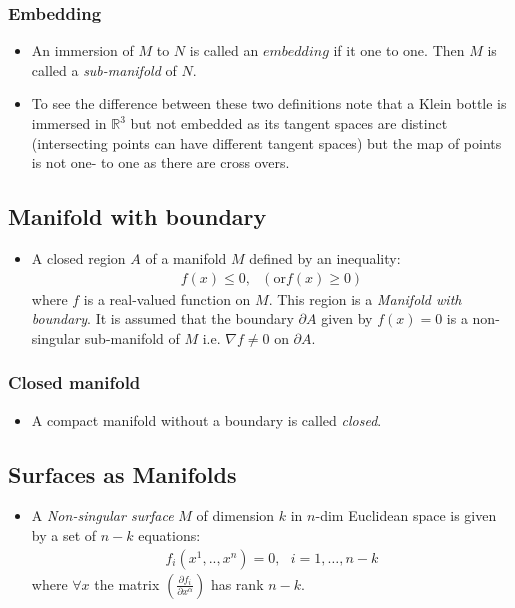 \documentclass[11pt]{article}
\numberwithin{equation}{section}
\DeclareRobustCommand{\RR}{\mathbb{R}}
\begin{document}
\subsubsection{Embedding}
\begin{itemize}
  \item An immersion of $M$ to $N$ is called an $embedding$ if it one to one. Then $M$ is called a \emph{sub-manifold} of $N$. 

  \item To see the difference between these two definitions note that a Klein bottle is immersed in $\RR^3$ but not embedded as its tangent spaces are distinct (intersecting points can have different tangent spaces) but the map of points is not one- to one as there are cross overs. 
\end{itemize}

\subsection{Manifold with boundary}
\begin{itemize}
  \item A closed region $A$ of a manifold $M$ defined by an inequality:
  \begin{align*}
    f(x) \leq  0, ~~~(\text{or} f(x) \geq 0)
  \end{align*}
  where $f$ is a real-valued function on $M$. This region is a \emph{Manifold with boundary}. It is assumed that the boundary $\partial A$ given by $f(x)=0$ is a non-singular sub-manifold of $M$ i.e. $\nabla f \neq 0 $ on $\partial A$. 
\end{itemize}
\subsubsection{Closed manifold}
\begin{itemize}
  \item A compact manifold without a boundary is called \emph{closed}. 
\end{itemize}

\subsection{Surfaces as Manifolds}
\begin{itemize}
  \item A \emph{Non-singular surface} $M$ of dimension $k$ in $n$-dim Euclidean space is given by a set of $n-k$ equations:
  \begin{align*}
  f_i(x^1,..,x^n) = 0,~~~i=1,\ldots,n-k
  \end{align*}
  where $\forall x$ the matrix $\left(\frac{\partial f_i}{\partial x^{\alpha}}\right)$ has rank $n-k$. 
\end{itemize}
\end{document}
